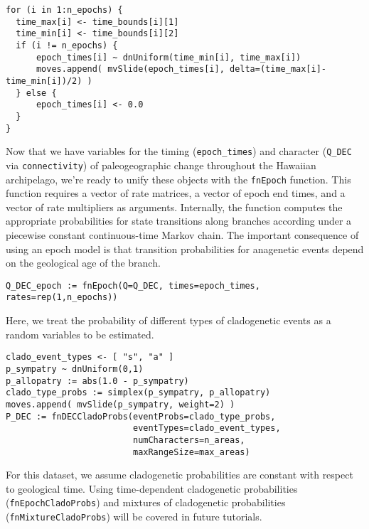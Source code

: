 \begin{snugshade}
\begin{lstlisting}
for (i in 1:n_epochs) {
  time_max[i] <- time_bounds[i][1]
  time_min[i] <- time_bounds[i][2]
  if (i != n_epochs) {
      epoch_times[i] ~ dnUniform(time_min[i], time_max[i])
      moves.append( mvSlide(epoch_times[i], delta=(time_max[i]-time_min[i])/2) )
  } else {
      epoch_times[i] <- 0.0
  }
}
\end{lstlisting}
\end{snugshade}

Now that we have variables for the timing ({\tt epoch\_times}) and character ({\tt Q\_DEC} via {\tt connectivity}) of paleogeographic change throughout the Hawaiian archipelago, we're ready to unify these objects with the {\tt fnEpoch} function.
This function requires a vector of rate matrices, a vector of epoch end times, and a vector of rate multipliers as arguments.
Internally, the function computes the appropriate probabilities for state transitions along branches according under a piecewise constant continuous-time Markov chain.
The important consequence of using an epoch model is that transition probabilities for anagenetic events depend on the geological age of the branch.

\begin{snugshade}
\begin{lstlisting}
Q_DEC_epoch := fnEpoch(Q=Q_DEC, times=epoch_times, rates=rep(1,n_epochs))
\end{lstlisting}
\end{snugshade}

Here, we treat the probability of different types of cladogenetic events as a random variables to be estimated.

\begin{snugshade}
\begin{lstlisting}
clado_event_types <- [ "s", "a" ]
p_sympatry ~ dnUniform(0,1)
p_allopatry := abs(1.0 - p_sympatry)
clado_type_probs := simplex(p_sympatry, p_allopatry)
moves.append( mvSlide(p_sympatry, weight=2) )
P_DEC := fnDECCladoProbs(eventProbs=clado_type_probs,
                         eventTypes=clado_event_types,
                         numCharacters=n_areas,
                         maxRangeSize=max_areas)
\end{lstlisting}
\end{snugshade}

For this dataset, we assume cladogenetic probabilities are constant with respect to geological time.
Using time-dependent cladogenetic probabilities ({\tt fnEpochCladoProbs}) and mixtures of cladogenetic probabilities ({\tt fnMixtureCladoProbs}) will be covered in future tutorials.


